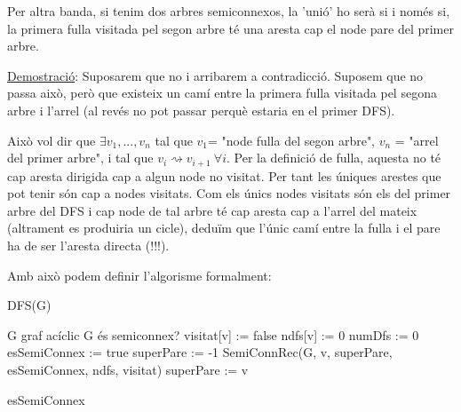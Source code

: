 \documentclass[a4paper,12pt]{article}
\begin{document}
Per altra banda, si tenim dos arbres semiconnexos, la 'unió' ho serà si i només si, la primera fulla visitada pel segon arbre té una aresta cap el node pare del primer arbre.

\underline{Demostració}: Suposarem que no i arribarem a contradicció.
Suposem que no passa això, però que existeix un camí entre la primera fulla visitada pel segona arbre i l'arrel (al revés no pot passar perquè estaria en el primer DFS). 

Això vol dir que $\exists v_1,...,v_n$ tal que $v_1$= "node fulla del segon arbre",  $v_n$ = "arrel del primer arbre", i tal que $v_i \rightsquigarrow v_{i+1} \ \forall i$. Per la definició de fulla, aquesta no té cap aresta dirigida cap a algun node no visitat. Per tant les úniques arestes que pot tenir són cap a nodes visitats. Com els únics nodes visitats són els del primer arbre del DFS i cap node de tal arbre té cap aresta cap a l'arrel del mateix (altrament es produiria un cicle), deduïm que l'únic camí entre la fulla i el pare ha de ser l'aresta directa (!!!).

Amb això podem definir l'algorisme formalment:

\newpage

\begin{algorithm}[H]
    \caption{DFS(G)}
    \begin{algorithmic}[1]  %
        \Require G graf acíclic
        \Ensure G és semiconnex?
            \State visitat[v] := false
            \State ndfs[v] := 0
        \EndFor
        \State
        \State numDfs := 0
        \State esSemiConnex := true
        \State superPare := -1
        \State
                \State SemiConnRec(G, v, superPare, esSemiConnex, ndfs, visitat)
                \State superPare := v
            \EndIf
        \EndFor

        \State

        \State \Return esSemiConnex
    \end{algorithmic}
\end{algorithm}
\end{document}
